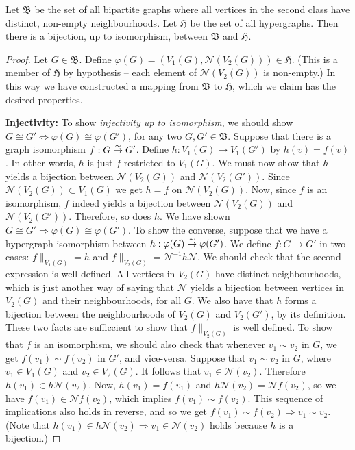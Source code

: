 \begin{lemma}
Let $\mathfrak{B}$ be the set of all bipartite graphs where all vertices in the second class have distinct, non-empty neighbourhoods.
Let $\mathfrak{H}$ be the set of all hypergraphs.
Then there is a bijection, up to isomorphism, between $\mathfrak{B}$ and $\mathfrak{H}$.
\end{lemma}
\begin{proof}
Let $G \in \mathfrak{B}$. Define $\varphi(G) = (V_1(G), \mathcal{N}(V_2(G))) \in \mathfrak{H}$.
(This is a member of $\mathfrak{H}$ by hypothesis -- each element of $\mathcal{N}(V_2(G))$ is non-empty.)
In this way we have constructed a mapping from $\mathfrak{B}$ to $\mathfrak{H}$, which we claim has the desired properties.

\textbf{Injectivity:}
To show \emph{injectivity up to isomorphism}, we should show $G \cong G' \Leftrightarrow \varphi(G) \cong \varphi(G')$, for any two $G,G' \in \mathfrak{B}$.
Suppose that there is a graph isomorphism $f: G \overset\sim\to G'$.
Define $h: V_1(G) \rightarrow V_1(G')$ by $h(v) = f(v)$. In other words, $h$ is just $f$ restricted to $V_1(G)$.
We must now show that $h$ yields a bijection between $\mathcal{N}(V_2(G))$ and $\mathcal{N}(V_2(G'))$.
Since $\mathcal{N}(V_2(G)) \subset V_1(G)$ we get $h = f$ on $\mathcal{N}(V_2(G))$.
Now, since $f$ is an isomorphism, $f$ indeed yields a bijection between $\mathcal{N}(V_2(G))$ and $\mathcal{N}(V_2(G'))$. Therefore, so does $h$.
We have shown $G \cong G' \Rightarrow \varphi(G) \cong \varphi(G')$.
To show the converse, suppose that we have a hypergraph isomorphism between $h: \varphi(G) \overset\sim\to \varphi(G')$.
We define $f: G \rightarrow G'$ in two cases: $f \|_{V_1(G)} = h$ and $f \|_{V_2(G)} = \mathcal{N}^{-1} h \mathcal{N}$.
We should check that the second expression is well defined. All vertices in $V_2(G)$ have distinct neighbourhoods, which is just another way of saying that $\mathcal{N}$ yields a bijection between vertices in $V_2(G)$ and their neighbourhoods, for all $G$. We also have that $h$ forms a bijection between the neighbourhoods of $V_2(G)$ and $V_2(G')$, by its definition. These two facts are sufficcient to show that $f \|_{V_2(G)}$ is well defined.
To show that $f$ is an isomorphism, we should also check that whenever $v_1 \sim v_2$ in $G$, we get $f(v_1) \sim f(v_2)$ in $G'$, and vice-versa.
Suppose that $v_1 \sim v_2$ in $G$, where $v_1 \in V_1(G)$ and $v_2 \in V_2(G)$. It follows that $v_1 \in \mathcal{N}(v_2)$.
Therefore $h(v_1) \in h \mathcal{N}( v_2 )$.
Now, $h(v_1) = f(v_1)$ and $h \mathcal{N} (v_2) = \mathcal{N} f (v_2) $, so we have $f(v_1) \in \mathcal{N} f (v_2)$, which implies $f(v_1) \sim f(v_2)$.
This sequence of implications also holds in reverse, and so we get $f(v_1) \sim f(v_2) \Rightarrow v_1 \sim v_2$. (Note that $h(v_1) \in h \mathcal{N}(v_2) \Rightarrow v_1 \in \mathcal{N}(v_2)$ holds because $h$ is a bijection.)


\end{proof}
